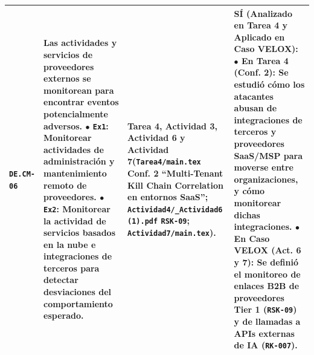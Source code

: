 \documentclass[letterpaper,11pt]{article}
\begin{document}
\begin{longtable}{|C{1.5cm}|L{5.3cm}|L{4.3cm}|L{5.8cm}|}
\texttt{DE.CM-06} &
\textbf{Las actividades y servicios de proveedores externos se monitorean para encontrar eventos potencialmente adversos.}\newline
$\bullet$ \texttt{Ex1}: Monitorear actividades de administración y mantenimiento remoto de proveedores.\newline
$\bullet$ \texttt{Ex2}: \textbf{Monitorear la actividad de servicios basados en la nube e integraciones de terceros para detectar desviaciones del comportamiento esperado}. &
\textbf{Tarea 4, Actividad 3, Actividad 6 y Actividad 7}\newline (\texttt{Tarea4/main.tex} Conf. 2 ``Multi-Tenant Kill Chain Correlation en entornos SaaS''; \texttt{Actividad4/\_Actividad6 (1).pdf} \texttt{RSK-09}; \texttt{Actividad7/main.tex}). &
\textbf{SÍ (Analizado en Tarea 4 y Aplicado en Caso VELOX):}\newline
$\bullet$ \textbf{En Tarea 4 (Conf. 2):} Se estudió cómo los atacantes abusan de integraciones de terceros y proveedores SaaS/MSP para moverse entre organizaciones, y cómo monitorear dichas integraciones.\newline
$\bullet$ \textbf{En Caso VELOX (Act. 6 y 7):} Se definió el monitoreo de enlaces B2B de proveedores Tier 1 (\texttt{RSK-09}) y de llamadas a APIs externas de IA (\texttt{RK-007}). \\
\hline


\end{longtable}
\end{document}
